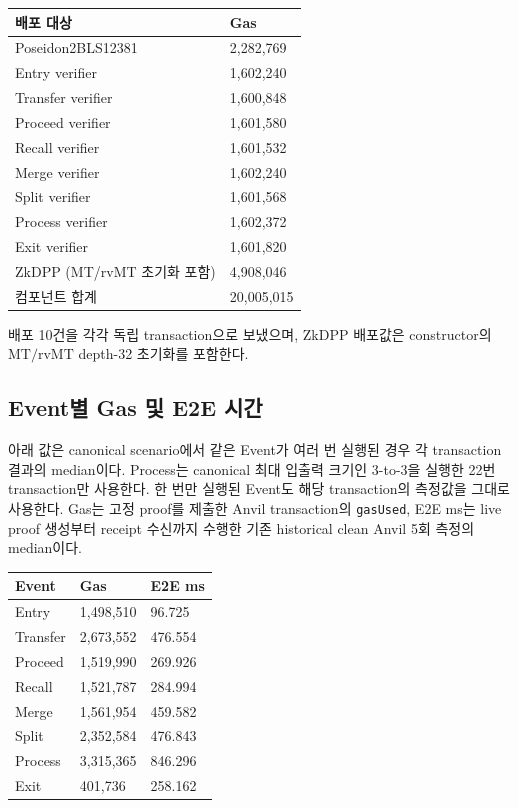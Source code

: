\documentclass[11pt,a4paper]{extarticle}
\newcommand{\MT}{\mathrm{MT}}
\newcommand{\rvMT}{\mathrm{rvMT}}
\begin{document}
\begin{center}
  \begin{tabular}{@{}ll@{}}
    \toprule
    배포 대상                  & Gas        \\
    \midrule
    Poseidon2BLS12381      & 2,282,769  \\
    Entry verifier         & 1,602,240  \\
    Transfer verifier      & 1,600,848  \\
    Proceed verifier       & 1,601,580  \\
    Recall verifier        & 1,601,532  \\
    Merge verifier         & 1,602,240  \\
    Split verifier         & 1,601,568  \\
    Process verifier       & 1,602,372  \\
    Exit verifier          & 1,601,820  \\
    ZkDPP (MT/rvMT 초기화 포함) & 4,908,046  \\
    \midrule
    컴포넌트 합계                & 20,005,015 \\
    \bottomrule
  \end{tabular}
\end{center}

배포 10건을 각각 독립 transaction으로 보냈으며, ZkDPP 배포값은 constructor의
$\MT/\rvMT$ depth-32 초기화를 포함한다.

\clearpage
\subsection{Event별 Gas 및 E2E 시간}

아래 값은 canonical scenario에서 같은 Event가 여러 번 실행된 경우 각 transaction 결과의
median이다. Process는 canonical 최대 입출력 크기인 3-to-3을 실행한 22번 transaction만
사용한다. 한 번만 실행된 Event도 해당 transaction의 측정값을 그대로 사용한다. Gas는
고정 proof를 제출한 Anvil transaction의 \texttt{gasUsed}, E2E ms는 live proof 생성부터
receipt 수신까지 수행한 기존 historical clean Anvil 5회 측정의 median이다.

\begin{center}
  \begin{tabular}{@{}l@{\hspace{25mm}}l@{\hspace{25mm}}l@{}}
    \toprule
    Event    & Gas       & E2E ms  \\
    \midrule
    Entry    & 1,498,510 & 96.725  \\
    Transfer & 2,673,552 & 476.554 \\
    Proceed  & 1,519,990 & 269.926 \\
    Recall   & 1,521,787 & 284.994 \\
    Merge    & 1,561,954 & 459.582 \\
    Split    & 2,352,584 & 476.843 \\
    Process  & 3,315,365 & 846.296 \\
    Exit     & 401,736   & 258.162 \\
    \bottomrule
  \end{tabular}
\end{center}
\end{document}
